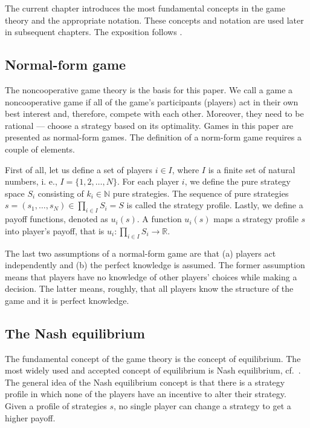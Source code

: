 \documentclass[english, twoside, 12pt, a4paper]{article}
\theoremstyle{definition}
\theoremstyle{plain}
\theoremstyle{remark}
\newcommand{\setn}{\mathbb{N}}
\begin{document}
The current chapter introduces the most fundamental concepts in the game theory and the appropriate notation. These concepts and notation are used later in subsequent chapters. The exposition follows \cite{fudenberg1991game,gibbons1992game}.

\subsection{Normal-form game}

The noncooperative game theory is the basis for this paper. We call a game a noncooperative game if all of the game's participants (players) act in their own best interest and, therefore, compete with each other. Moreover, they need to be rational --- choose a strategy based on its optimality. Games in this paper are presented as normal-form games. The definition of a norm-form game requires a couple of elements. 

First of all, let us define a set of players $i \in I$, where $I$ is a finite set of natural numbers, i. e., $I = \{1, 2, \ldots, N\}$. For each player $i$, we define the pure strategy space $S_i$ consisting of $k_i \in \setn$ pure strategies. The sequence of pure strategies $s = \left(s_1, \ldots, s_N \right) \in \prod_{i \in I} S_i = S$ is called the strategy profile. Lastly, we define a payoff functions, denoted as $u_i(s)$. A function \(u_i (s)\) maps a strategy profile \(s\) into player's payoff, that is $u_i: \prod_{i \in I}S_i \rightarrow \mathbb{R}$.

The last two assumptions of a normal-form game are that (a) players act independently and (b) the perfect knowledge is assumed. The former assumption means that players have no knowledge of other players' choices while making a decision. The latter means, roughly, that all players know the structure of the game and it is perfect knowledge.

\subsection{The Nash equilibrium}

The fundamental concept of the game theory is the concept of equilibrium. The most widely used and accepted concept of equilibrium is Nash equilibrium, cf.~\cite{nash1951non}. The general idea of the Nash equilibrium concept is that there is a strategy profile in which none of the players have an incentive to alter their strategy. Given a profile of strategies \(s\), no single player can change a strategy to get a higher payoff.
\end{document}
